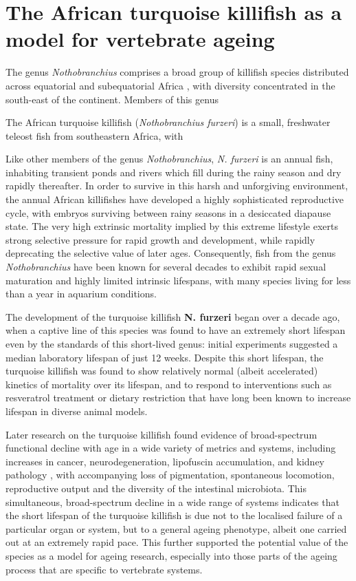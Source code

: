 \section{The African turquoise killifish as a model for vertebrate ageing}

The genus \textit{Nothobranchius} comprises a broad group of killifish species distributed across equatorial and subequatorial Africa \citep{valdesalici2003lifespan}, with diversity concentrated in the south-east of the continent. Members of this genus 

The African turquoise killifish (\textit{Nothobranchius furzeri}) is a small, freshwater teleost fish from southeastern Africa, with 

Like other members of the genus \textit{Nothobranchius}, \textit{N. furzeri} is an annual fish, inhabiting transient ponds and rivers which fill during the rainy season and dry rapidly thereafter. In order to survive in this harsh and unforgiving environment, the annual African killifishes have developed a highly sophisticated reproductive cycle, with embryos surviving between rainy seasons in a desiccated diapause state. The very high extrinsic mortality implied by this extreme lifestyle exerts strong selective pressure for rapid growth and development, while rapidly deprecating the selective value of later ages. Consequently, fish from the genus \textit{Nothobranchius} have been known for several decades to exhibit rapid sexual maturation and highly limited intrinsic lifespans, with many species living for less than a year in aquarium conditions. 

The development of the turquoise killifish \textbf{N. furzeri} began over a decade ago, when a captive line of this species was found to have an extremely short lifespan even by the standards of this short-lived genus: initial experiments suggested a median laboratory lifespan of just 12 weeks. Despite this short lifespan, the turquoise killifish was found to show relatively normal (albeit accelerated) kinetics of mortality over its lifespan, and to respond to interventions such as resveratrol treatment or dietary restriction that have long been known to increase lifespan in diverse animal models. 

Later research on the turquoise killifish found evidence of broad-spectrum functional decline with age in a wide variety of metrics and systems, including increases in cancer, neurodegeneration, lipofuscin accumulation, and kidney pathology %
, with accompanying loss of pigmentation, spontaneous locomotion, reproductive output and the diversity of the intestinal microbiota. This simultaneous, broad-spectrum decline in a wide range of systems indicates that the short lifespan of the turquoise killifish is due not to the localised failure of a particular organ or system, but to a general ageing phenotype, albeit one carried out at an extremely rapid pace. This further supported the potential value of the species as a model for ageing research, especially into those parts of the ageing process that are specific to vertebrate systems.

